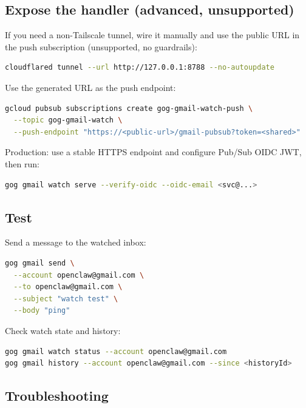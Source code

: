 \subsection{Expose the handler (advanced, unsupported)}


If you need a non-Tailscale tunnel, wire it manually and use the public URL in the push
subscription (unsupported, no guardrails):

\begin{lstlisting}[language=bash]
cloudflared tunnel --url http://127.0.0.1:8788 --no-autoupdate
\end{lstlisting}


Use the generated URL as the push endpoint:

\begin{lstlisting}[language=bash]
gcloud pubsub subscriptions create gog-gmail-watch-push \
  --topic gog-gmail-watch \
  --push-endpoint "https://<public-url>/gmail-pubsub?token=<shared>"
\end{lstlisting}


Production: use a stable HTTPS endpoint and configure Pub/Sub OIDC JWT, then run:

\begin{lstlisting}[language=bash]
gog gmail watch serve --verify-oidc --oidc-email <svc@...>
\end{lstlisting}


\subsection{Test}


Send a message to the watched inbox:

\begin{lstlisting}[language=bash]
gog gmail send \
  --account openclaw@gmail.com \
  --to openclaw@gmail.com \
  --subject "watch test" \
  --body "ping"
\end{lstlisting}


Check watch state and history:

\begin{lstlisting}[language=bash]
gog gmail watch status --account openclaw@gmail.com
gog gmail history --account openclaw@gmail.com --since <historyId>
\end{lstlisting}


\subsection{Troubleshooting}


